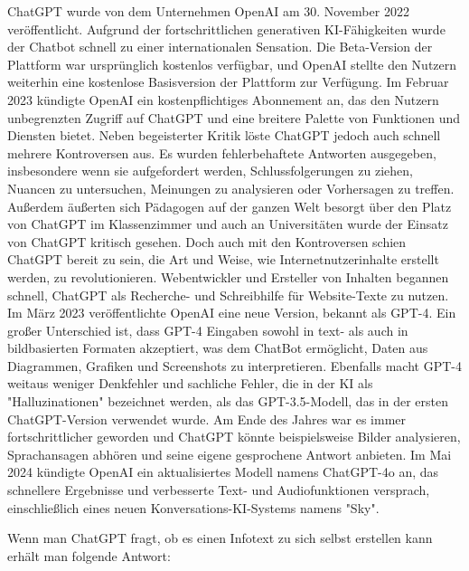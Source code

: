 ChatGPT wurde von dem Unternehmen OpenAI am 30. November 2022 veröffentlicht. Aufgrund der fortschrittlichen generativen 
KI-Fähigkeiten wurde der Chatbot schnell zu einer internationalen Sensation. Die Beta-Version der Plattform war 
ursprünglich kostenlos verfügbar, und OpenAI stellte den Nutzern weiterhin eine kostenlose Basisversion der Plattform zur 
Verfügung. Im Februar 2023 kündigte OpenAI ein kostenpflichtiges Abonnement an, das den Nutzern unbegrenzten Zugriff auf 
ChatGPT und eine breitere Palette von Funktionen und Diensten bietet.
Neben begeisterter Kritik löste ChatGPT jedoch auch schnell mehrere Kontroversen aus. Es wurden fehlerbehaftete 
Antworten ausgegeben, insbesondere wenn sie aufgefordert werden, Schlussfolgerungen zu ziehen, Nuancen zu untersuchen, 
Meinungen zu analysieren oder Vorhersagen zu treffen. Außerdem äußerten sich Pädagogen auf der ganzen Welt besorgt über 
den Platz von ChatGPT im Klassenzimmer und auch an Universitäten wurde der Einsatz von ChatGPT kritisch gesehen.
Doch auch mit den Kontroversen schien ChatGPT bereit zu sein, die Art und Weise, wie Internetnutzerinhalte erstellt werden,
zu revolutionieren. Webentwickler und Ersteller von Inhalten begannen schnell, ChatGPT als Recherche- und Schreibhilfe für 
Website-Texte zu nutzen.
Im März 2023 veröffentlichte OpenAI eine neue Version, bekannt als GPT-4. Ein großer Unterschied ist, dass GPT-4 
Eingaben sowohl in text- als auch in bildbasierten Formaten akzeptiert, was dem ChatBot ermöglicht, Daten aus 
Diagrammen, Grafiken und Screenshots zu interpretieren. Ebenfalls macht GPT-4 weitaus weniger Denkfehler und sachliche 
Fehler, die in der KI als "Halluzinationen" bezeichnet werden, als das GPT-3.5-Modell, das in der ersten ChatGPT-Version 
verwendet wurde. Am Ende des Jahres war es immer fortschrittlicher geworden und ChatGPT könnte beispielsweise Bilder 
analysieren, Sprachansagen abhören und seine eigene gesprochene Antwort anbieten. Im Mai 2024 kündigte OpenAI ein 
aktualisiertes Modell namens ChatGPT-4o an, das schnellere Ergebnisse und verbesserte Text- und Audiofunktionen versprach,
einschließlich eines neuen Konversations-KI-Systems namens "Sky"\cite{GrundlagenChatGPT}.

Wenn man ChatGPT fragt, ob es einen Infotext zu sich selbst erstellen kann erhält man folgende Antwort:

